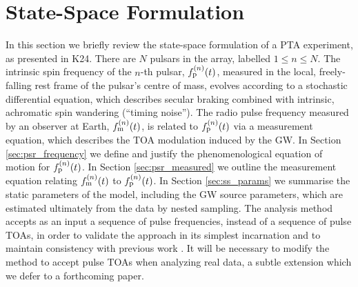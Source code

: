 \documentclass[fleqn,usenatbib,useAMS]{mnras}
\begin{document}
\section{State-Space Formulation}\label{sec:2}
In this section we briefly review the state-space formulation of a PTA experiment, as presented in K24. There are $N$ pulsars in the array, labelled $1\leq n\leq N$. The intrinsic spin frequency of the $n$-th pulsar, $f_{\rm p}^{(n)}(t)$, measured in the local, freely-falling rest frame of the pulsar's centre of mass, evolves according to a stochastic differential equation,  which describes secular braking combined with intrinsic, achromatic spin wandering (``timing noise''). The radio pulse frequency measured by an observer at Earth, $f_{\rm m}^{(n)}(t)$, is related to $f_{\rm p}^{(n)}(t)$ via a measurement equation, which describes the TOA modulation induced by the GW. In Section \ref{sec:psr_frequency} we define and justify the phenomenological equation of motion for $f_{\rm p}^{(n)}(t)$. In Section \ref{sec:psr_measured} we outline the measurement equation relating $f_{\rm m}^{(n)}(t)$ to $f_{\rm p}^{(n)}(t)$. In Section \ref{sec:ss_params} we summarise the static parameters of the model, including the GW source parameters, which are estimated ultimately from the data by nested sampling. The analysis method accepts as an input a sequence of pulse frequencies, instead of a sequence of pulse TOAs, in order to validate the approach in its simplest incarnation and to maintain consistency with previous work \citep{Myers2021MNRAS.502.3113M,Meyers2021,KimpsonPTA}. It will be necessary to modify the method to accept pulse TOAs when analyzing real data, a subtle extension which we defer to a forthcoming paper. 
\end{document}
